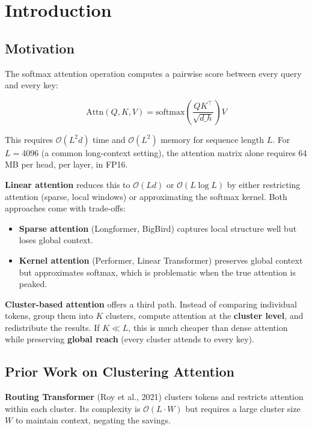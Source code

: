 \section{Introduction}

\subsection{Motivation}

The softmax attention operation computes a pairwise score between every 
query and every key:

\[
\text{Attn}(Q, K, V) = \text{softmax}\!\left(\frac{Q K^\top}{\sqrt{d\_h}}\right) V
\]

This requires $\mathcal{O}(L^2 d)$ time and $\mathcal{O}(L^2)$ memory for 
sequence length $L$. For $L = 4096$ (a common long-context setting), the 
attention matrix alone requires 64 MB per head, per layer, in FP16.

\textbf{Linear attention} reduces this to $\mathcal{O}(L d)$ or 
$\mathcal{O}(L \log L)$ by either restricting attention (sparse, local 
windows) or approximating the softmax kernel. Both approaches come with 
trade-offs:

\begin{itemize}
\item \textbf{Sparse attention} (Longformer, BigBird) captures local structure well
  but loses global context.
\item \textbf{Kernel attention} (Performer, Linear Transformer) preserves global
  context but approximates softmax, which is problematic when the true
  attention is peaked.

\end{itemize}
\textbf{Cluster-based attention} offers a third path. Instead of comparing 
individual tokens, group them into $K$ clusters, compute attention at the 
\textbf{cluster level}, and redistribute the results. If $K \ll L$, this is much 
cheaper than dense attention while preserving \textbf{global reach} (every 
cluster attends to every key).

\subsection{Prior Work on Clustering Attention}

\textbf{Routing Transformer} (Roy et al., 2021) clusters tokens and restricts 
attention within each cluster. Its complexity is $\mathcal{O}(L \cdot W)$ 
but requires a large cluster size $W$ to maintain context, negating the 
savings.

